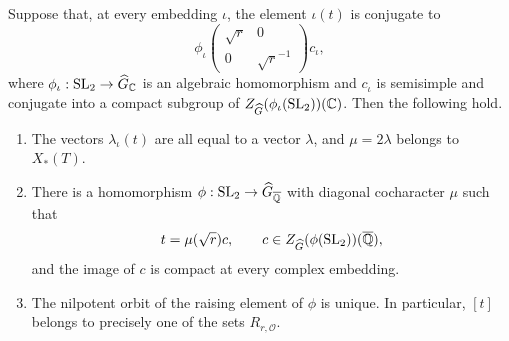 \begin{lemma}\label{glob:embeddings}
Suppose that, at every embedding $\iota$, the element $\iota(t)$ is
conjugate to
\[
 \phi_\iota\!\begin{pmatrix}\sqrt r&0\\0&\sqrt r^{-1}\end{pmatrix}
 c_\iota,
\]
where $\phi_\iota:\operatorname{SL}_2\to\widehat G_{\mathbb C}$ is an
algebraic homomorphism and $c_\iota$ is semisimple and conjugate into
a compact subgroup of
$Z_{\widehat G}(\phi_\iota(\operatorname{SL}_2))(\mathbb C)$.
Then the following hold.
\begin{enumerate}[label=\textup{(\roman*)}]
\item The vectors $\lambda_\iota(t)$ are all equal to a vector
      $\lambda$, and $\mu=2\lambda$ belongs to $X_*(T)$.
\item There is a homomorphism
      $\phi:\operatorname{SL}_2\to\widehat G_{\overline{\mathbb Q}}$
      with diagonal cocharacter $\mu$ such that
      \[
        t=\mu(\sqrt r)c,
        \qquad
        c\in Z_{\widehat G}(\phi(\operatorname{SL}_2))
                  (\overline{\mathbb Q}),
      \]
      and the image of $c$ is compact at every complex embedding.
\item The nilpotent orbit of the raising element of $\phi$ is unique.
      In particular, $[t]$ belongs to precisely one of the sets
      $R_{r,\mathcal O}$.
\end{enumerate}
\end{lemma}

